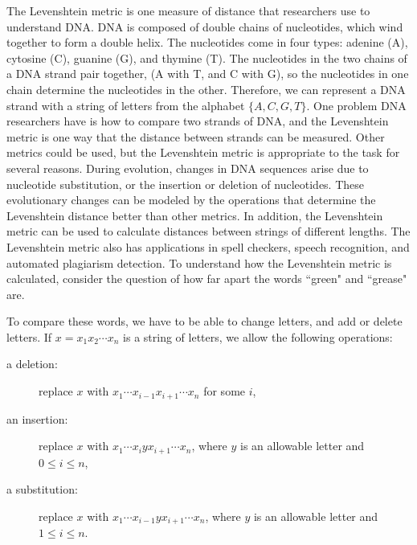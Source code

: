 The Levenshtein metric is one measure of distance that researchers use to understand DNA. DNA is composed of double chains of nucleotides, which wind together to form a double helix. The nucleotides come in four types: adenine (A), cytosine (C), guanine (G), and thymine (T). The nucleotides in the two chains of a DNA strand pair together, (A with T, and C with G), so the nucleotides in one chain determine the nucleotides in the other. Therefore, we can represent a DNA strand with a string of letters from the alphabet $\{A, C, G, T\}$. One problem DNA researchers have is how to compare two strands of DNA, and the Levenshtein metric is one way that the distance between strands can be measured. Other metrics could be used, but the Levenshtein metric is appropriate to the task for several reasons. During evolution, changes in DNA sequences arise due to nucleotide substitution, or the insertion or deletion of nucleotides. These evolutionary changes can be modeled by the operations that determine the Levenshtein distance better than other metrics. In addition, the Levenshtein metric can be used to calculate distances between strings of different lengths. The Levenshtein metric also has applications in spell checkers, speech recognition, and automated plagiarism detection. To understand how the Levenshtein metric is calculated, consider the question of how far apart the words ``green" and ``grease" are.

To compare these words, we have to be able to change letters, and add or delete letters. If $x = x_1x_2 \cdots x_n$ is a string of letters, we allow the following operations:
\begin{description}
\item[a deletion:] replace $x$ with $x_1 \cdots x_{i-1}x_{i+1} \cdots x_n$ for some $i$, 
\item[an insertion:] replace $x$ with $x_1 \cdots x_{i}yx_{i+1} \cdots x_n$, where $y$ is an allowable letter and $0 \leq i \leq n$, 
\item[a substitution:] replace $x$ with $x_1 \cdots x_{i-1}yx_{i+1} \cdots x_n$, where $y$ is an allowable letter and $1 \leq i \leq n$.
\end{description}

